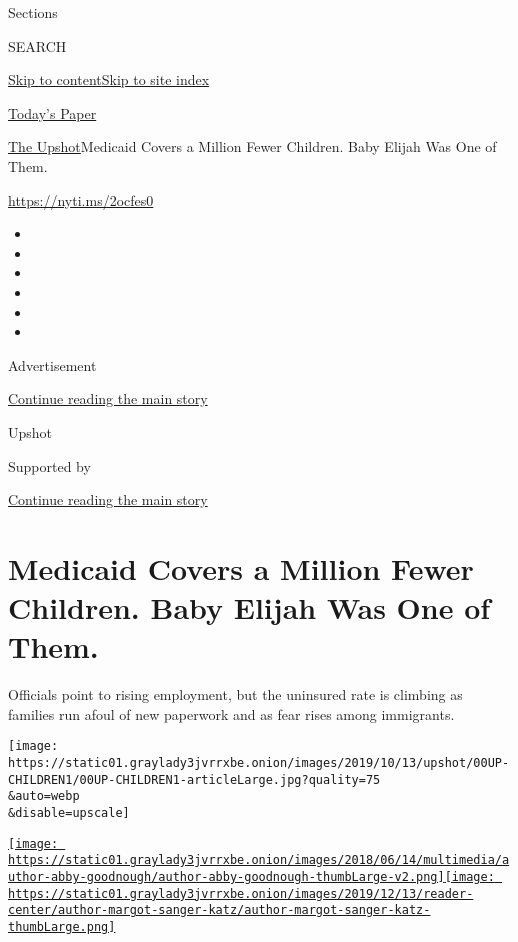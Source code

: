 Sections

SEARCH

\protect\hyperlink{site-content}{Skip to
content}\protect\hyperlink{site-index}{Skip to site index}

\href{https://myaccount.nytimes3xbfgragh.onion/auth/login?response_type=cookie\&client_id=vi}{}

\href{https://www.nytimes3xbfgragh.onion/section/todayspaper}{Today's
Paper}

\href{/section/upshot}{The Upshot}\textbar{}Medicaid Covers a Million
Fewer Children. Baby Elijah Was One of Them.

\url{https://nyti.ms/2ocfes0}

\begin{itemize}
\item
\item
\item
\item
\item
\item
\end{itemize}

Advertisement

\protect\hyperlink{after-top}{Continue reading the main story}

Upshot

Supported by

\protect\hyperlink{after-sponsor}{Continue reading the main story}

\hypertarget{medicaid-covers-a-million-fewer-children-baby-elijah-was-one-of-them}{%
\section{Medicaid Covers a Million Fewer Children. Baby Elijah Was One
of
Them.}\label{medicaid-covers-a-million-fewer-children-baby-elijah-was-one-of-them}}

Officials point to rising employment, but the uninsured rate is climbing
as families run afoul of new paperwork and as fear rises among
immigrants.

\texttt{[image: https://static01.graylady3jvrrxbe.onion/images/2019/10/13/upshot/00UP-CHILDREN1/00UP-CHILDREN1-articleLarge.jpg?quality=75\\\&auto=webp\\\&disable=upscale]}

\href{https://www.nytimes3xbfgragh.onion/by/abby-goodnough}{\texttt{[image: https://static01.graylady3jvrrxbe.onion/images/2018/06/14/multimedia/author-abby-goodnough/author-abby-goodnough-thumbLarge-v2.png]}}\href{https://www.nytimes3xbfgragh.onion/by/margot-sanger-katz}{\texttt{[image: https://static01.graylady3jvrrxbe.onion/images/2019/12/13/reader-center/author-margot-sanger-katz/author-margot-sanger-katz-thumbLarge.png]}}

